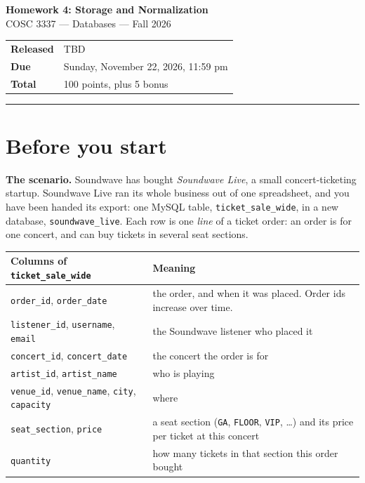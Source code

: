\documentclass[11pt]{article}
\newcommand{\hwnum}{4}
\newcommand{\released}{TBD}
\newcommand{\due}{Sunday, November 22, 2026, 11:59 pm}
\newcommand{\code}[1]{\texttt{#1}}
\begin{document}
\begin{center}
  {\LARGE\bfseries Homework \hwnum: Storage and Normalization}\\[4pt]
  {\large COSC 3337 --- Databases --- Fall 2026}\\[6pt]
  \begin{tabular}{@{}ll@{}}
    \textbf{Released} & \released \\
    \textbf{Due}      & \due \\
    \textbf{Total}    & 100 points, plus 5 bonus
  \end{tabular}
\end{center}
\vspace{2pt}\hrule\vspace{10pt}

\section*{Before you start}

\textbf{The scenario.} Soundwave has bought \emph{Soundwave Live}, a small
concert-ticketing startup. Soundwave Live ran its whole business out of one
spreadsheet, and you have been handed its export: one MySQL table,
\code{ticket\_sale\_wide}, in a new database, \code{soundwave\_live}. Each row
is one \emph{line} of a ticket order: an order is for one concert, and can buy
tickets in several seat sections.

\begin{center}
\small
\begin{tabularx}{\linewidth}{@{}l X@{}}
\toprule
\textbf{Columns of \code{ticket\_sale\_wide}} & \textbf{Meaning}\\
\midrule
\code{order\_id}, \code{order\_date} & the order, and when it was placed. Order ids increase over time.\\
\code{listener\_id}, \code{username}, \code{email} & the Soundwave listener who placed it\\
\code{concert\_id}, \code{concert\_date} & the concert the order is for\\
\code{artist\_id}, \code{artist\_name} & who is playing\\
\code{venue\_id}, \code{venue\_name}, \code{city}, \code{capacity} & where\\
\code{seat\_section}, \code{price} & a seat section (\code{GA}, \code{FLOOR}, \code{VIP}, \ldots) and its price per ticket at this concert\\
\code{quantity} & how many tickets in that section this order bought\\
\bottomrule
\end{tabularx}
\end{center}
\end{document}
